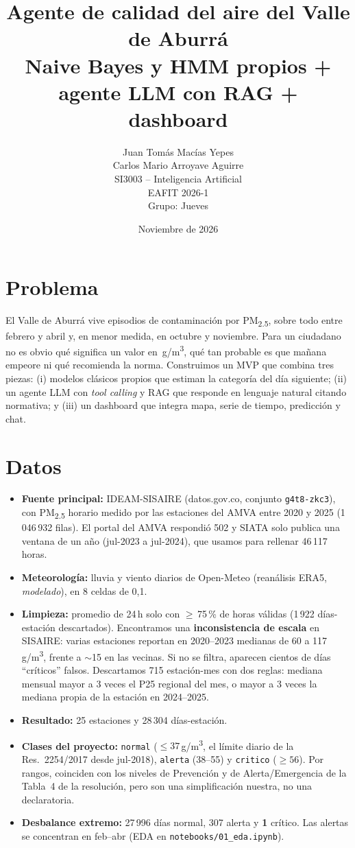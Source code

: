 \documentclass[10pt,a4paper]{article}
\title{\vspace{-1.2cm}\textbf{Agente de calidad del aire del Valle de Aburrá}\\[2pt]
\large Naive Bayes y HMM propios + agente LLM con RAG + dashboard}
\author{Juan Tomás Macías Yepes \\ Carlos Mario Arroyave Aguirre \\ SI3003 -- Inteligencia Artificial\\ EAFIT 2026-1 \\ Grupo: Jueves }
\date{Noviembre de 2026}
\newcommand{\ugm}{\,\textmu g/m\textsuperscript{3}}
\newcommand{\code}[1]{\texttt{\small #1}}
\newcommand{\pmd}{PM\textsubscript{2.5}}
\begin{document}
\maketitle
\vspace{-0.6cm}

\section{Problema}
El Valle de Aburrá vive episodios de contaminación por \pmd, sobre todo entre febrero y abril y, en
menor medida, en octubre y noviembre. Para un ciudadano no es obvio qué significa un valor en \ugm,
qué tan probable es que mañana empeore ni qué recomienda la norma. Construimos un MVP que combina tres
piezas: (i) modelos clásicos propios que estiman la categoría del día siguiente; (ii) un agente LLM
con \textit{tool calling} y RAG que responde en lenguaje natural citando normativa; y (iii) un
dashboard que integra mapa, serie de tiempo, predicción y chat.

\section{Datos}
\begin{itemize}
  \item \textbf{Fuente principal:} IDEAM-SISAIRE (datos.gov.co, conjunto \code{g4t8-zkc3}), con \pmd{}
    horario medido por las estaciones del AMVA entre 2020 y 2025 (1\,046\,932 filas). El portal del AMVA
    respondió 502 y SIATA solo publica una ventana de un año (jul-2023 a jul-2024), que usamos para
    rellenar 46\,117 horas.
  \item \textbf{Meteorología:} lluvia y viento diarios de Open-Meteo (reanálisis ERA5, \textit{modelado}),
    en 8 celdas de 0,1\textdegree.
  \item \textbf{Limpieza:} promedio de 24\,h solo con $\geq$\,75\,\% de horas válidas (1\,922 días-estación
    descartados). Encontramos una \textbf{inconsistencia de escala} en SISAIRE: varias estaciones reportan
    en 2020--2023 medianas de 60 a 117\ugm, frente a $\sim$15 en las vecinas. Si no se filtra, aparecen
    cientos de días ``críticos'' falsos. Descartamos 715 estación-mes con dos reglas: mediana mensual
    mayor a 3 veces el P25 regional del mes, o mayor a 3 veces la mediana propia de la estación en 2024--2025.
  \item \textbf{Resultado:} 25 estaciones y 28\,304 días-estación.
  \item \textbf{Clases del proyecto:} \code{normal} ($\leq 37$\ugm, el límite diario de la Res.~2254/2017
    desde jul-2018), \code{alerta} (38--55) y \code{critico} ($\geq 56$). Por rangos, coinciden con los
    niveles de Prevención y de Alerta/Emergencia de la Tabla~4 de la resolución, pero son una
    simplificación nuestra, no una declaratoria.
  \item \textbf{Desbalance extremo:} 27\,996 días normal, 307 alerta y \textbf{1} crítico. Las alertas se
    concentran en feb--abr (EDA en \code{notebooks/01\_eda.ipynb}).
\end{itemize}
\end{document}
